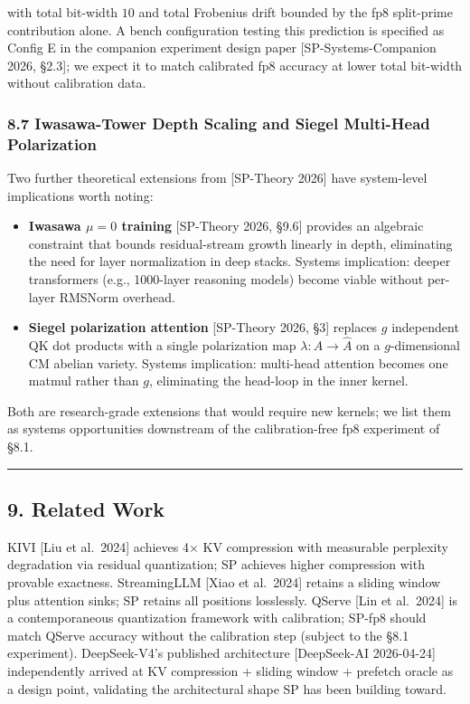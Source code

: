 \documentclass[
  11pt,
]{article}
\providecommand{\tightlist}{%
  \setlength{\itemsep}{0pt}\setlength{\parskip}{0pt}}
\begin{document}
with total bit-width \(10\) and total Frobenius drift bounded by the fp8
split-prime contribution alone. A bench configuration testing this
prediction is specified as Config E in the companion experiment design
paper {[}SP-Systems-Companion 2026, §2.3{]}; we expect it to match
calibrated fp8 accuracy at lower total bit-width without calibration
data.

\hypertarget{iwasawa-tower-depth-scaling-and-siegel-multi-head-polarization}{%
\subsubsection{8.7 Iwasawa-Tower Depth Scaling and Siegel Multi-Head
Polarization}\label{iwasawa-tower-depth-scaling-and-siegel-multi-head-polarization}}

Two further theoretical extensions from {[}SP-Theory 2026{]} have
system-level implications worth noting:

\begin{itemize}
\tightlist
\item
  \textbf{Iwasawa \(\mu = 0\) training} {[}SP-Theory 2026, §9.6{]}
  provides an algebraic constraint that bounds residual-stream growth
  linearly in depth, eliminating the need for layer normalization in
  deep stacks. Systems implication: deeper transformers (e.g.,
  1000-layer reasoning models) become viable without per-layer RMSNorm
  overhead.
\item
  \textbf{Siegel polarization attention} {[}SP-Theory 2026, §3{]}
  replaces \(g\) independent QK dot products with a single polarization
  map \(\lambda: A \to \widehat{A}\) on a \(g\)-dimensional CM abelian
  variety. Systems implication: multi-head attention becomes one matmul
  rather than \(g\), eliminating the head-loop in the inner kernel.
\end{itemize}

Both are research-grade extensions that would require new kernels; we
list them as systems opportunities downstream of the calibration-free
fp8 experiment of §8.1.

\begin{center}\rule{0.5\linewidth}{0.5pt}\end{center}

\hypertarget{related-work}{%
\subsection{9. Related Work}\label{related-work}}

KIVI {[}Liu et al.~2024{]} achieves 4× KV compression with measurable
perplexity degradation via residual quantization; SP achieves higher
compression with provable exactness. StreamingLLM {[}Xiao et al.~2024{]}
retains a sliding window plus attention sinks; SP retains all positions
losslessly. QServe {[}Lin et al.~2024{]} is a contemporaneous
quantization framework with calibration; SP-fp8 should match QServe
accuracy without the calibration step (subject to the §8.1 experiment).
DeepSeek-V4's published architecture {[}DeepSeek-AI 2026-04-24{]}
independently arrived at KV compression + sliding window + prefetch
oracle as a design point, validating the architectural shape SP has been
building toward.
\end{document}
